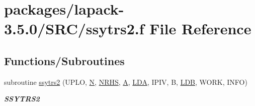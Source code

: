 \hypertarget{ssytrs2_8f}{}\section{packages/lapack-\/3.5.0/\+S\+R\+C/ssytrs2.f File Reference}
\label{ssytrs2_8f}
\subsection*{Functions/\+Subroutines}
\begin{DoxyCompactItemize}
\item 
subroutine \hyperlink{group__realSYcomputational_ga0e6312aad14fb7d54e0f3ef5111ec60a}{ssytrs2} (U\+P\+L\+O, \hyperlink{polmisc_8c_a0240ac851181b84ac374872dc5434ee4}{N}, \hyperlink{example__user_8c_aa0138da002ce2a90360df2f521eb3198}{N\+R\+H\+S}, \hyperlink{classA}{A}, \hyperlink{example__user_8c_ae946da542ce0db94dced19b2ecefd1aa}{L\+D\+A}, I\+P\+I\+V, B, \hyperlink{example__user_8c_a50e90a7104df172b5a89a06c47fcca04}{L\+D\+B}, W\+O\+R\+K, I\+N\+F\+O)
\begin{DoxyCompactList}\small\item\em {\bfseries S\+S\+Y\+T\+R\+S2} \end{DoxyCompactList}\end{DoxyCompactItemize}
